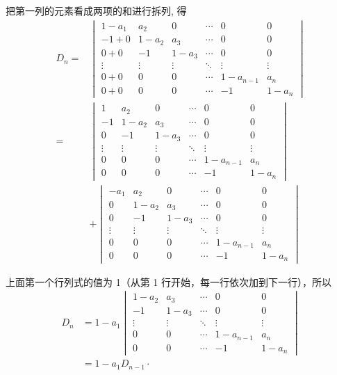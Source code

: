 \begin{solution}
    把第一列的元素看成两项的和进行拆列, 得
    \begin{align*}
        D_n=&\begin{vmatrix}
            1-a_{1} & a_{2} & 0 & \cdots & 0 & 0 \\
            -1+0 & 1-a_{2} & a_{3} & \cdots & 0 & 0 \\
            0+0 & -1 & 1-a_{3} & \cdots & 0 & 0 \\
            \vdots & \vdots & \vdots & \ddots & \vdots & \vdots \\
            0+0 & 0 & 0 & \cdots & 1-a_{n-1} & a_n \\
            0+0 & 0 & 0 & \cdots & -1 & 1-a_n
        \end{vmatrix}\\
        =&\begin{vmatrix}
            1 & a_{2} & 0 & \cdots & 0 & 0 \\
            -1 & 1-a_{2} & a_{3} & \cdots & 0 & 0 \\
            0 & -1 & 1-a_{3} & \cdots & 0 & 0 \\
            \vdots & \vdots & \vdots & \ddots & \vdots & \vdots \\
            0 & 0 & 0 & \cdots & 1-a_{n-1} & a_n \\
            0 & 0 & 0 & \cdots & -1 & 1-a_n
        \end{vmatrix} \\
        &+\begin{vmatrix}
            -a_{1} & a_{2} & 0 & \cdots & 0 & 0 \\
            0 & 1-a_{2} & a_{3} & \cdots & 0 & 0 \\
            0 & -1 & 1-a_{3} & \cdots & 0 & 0 \\
            \vdots & \vdots & \vdots & \ddots & \vdots & \vdots \\
            0 & 0 & 0 & \cdots & 1-a_{n-1} & a_n \\
            0 & 0 & 0 & \cdots & -1 & 1-a_n
        \end{vmatrix}
    \end{align*}

    上面第一个行列式的值为 1（从第 1 行开始，每一行依次加到下一行），所以
    \[ \begin{aligned}
        D_n &=1-a_{1}\begin{vmatrix}
        1-a_{2} & a_{3} & \cdots & 0 & 0 \\
        -1 & 1-a_{3} & \cdots & 0 & 0 \\
        \vdots & \vdots & \ddots & \vdots & \vdots \\
        0 & 0 & \cdots & 1-a_{n-1} & a_n \\
        0 & 0 & \cdots & -1 & 1-a_n
        \end{vmatrix} \\
        &=1-a_{1} D_{n-1} \cdot
    \end{aligned} \]


\end{solution}
